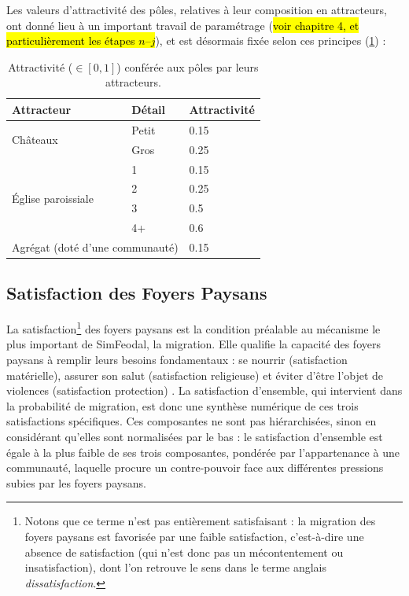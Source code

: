 Les valeurs d'attractivité des pôles, relatives à leur composition en attracteurs, ont donné lieu à un important travail de paramétrage (\hl{voir chapitre 4, et particulièrement les étapes $n$--$j$}), et est désormais fixée selon ces principes (\cref{tab:attraction-poles}) :

\begin{table}[H]
	\centering
		\caption{Attractivité ($\in [0,1]$) conférée aux pôles par leurs attracteurs.}
	\label{tab:attraction-poles}
	{\renewcommand{\arraystretch}{1.1}%
	\begin{tabular}{|l|l|l|}\hline
		\textbf{Attracteur} & \textbf{Détail} & \textbf{Attractivité} \\ \hline
		\multirow{2}{*}{Châteaux} & Petit & 0.15 \\
		& Gros & 0.25 \\ \hline
		\multirow{4}{*}{Église paroissiale} & 1 & 0.15 \\
		& 2 & 0.25 \\
		& 3 & 0.5 \\
		& 4+ & 0.6 \\ \hline
		\multicolumn{2}{|l|}{Agrégat (doté d'une communauté)} & 0.15 \\ \hline
	\end{tabular}}

\end{table}

\subsection{Satisfaction des Foyers Paysans}

La satisfaction\footnote{
Notons que ce terme n'est pas entièrement \og satisfaisant\fg{} : la migration des foyers paysans est favorisée par une faible satisfaction, c'est-à-dire une absence de satisfaction (qui n'est donc pas un mécontentement ou \og insatisfaction\fg{}), dont l'on retrouve le sens dans le terme anglais \textit{dissatisfaction}.
} des foyers paysans est la condition préalable au mécanisme le plus important de SimFeodal, la migration.
Elle qualifie la capacité des foyers paysans à remplir leurs besoins fondamentaux : \og se nourrir\fg{} (satisfaction matérielle), \og assurer son salut\fg{} (satisfaction religieuse) et \og éviter d'être l'objet de violences\fg{} (satisfaction \og protection\fg{}) \autocite[Tableau 1, \ppno~309]{cura_transition_2017}.
La satisfaction d'ensemble, qui intervient dans la probabilité de migration, est donc une synthèse numérique de ces trois satisfactions spécifiques.
Ces composantes ne sont pas hiérarchisées, sinon en considérant qu'elles sont normalisées \og par le bas\fg{} : le satisfaction d'ensemble est égale à la plus faible de ses trois composantes, pondérée par l'appartenance à une communauté, laquelle procure un contre-pouvoir face aux différentes pressions subies par les foyers paysans.

